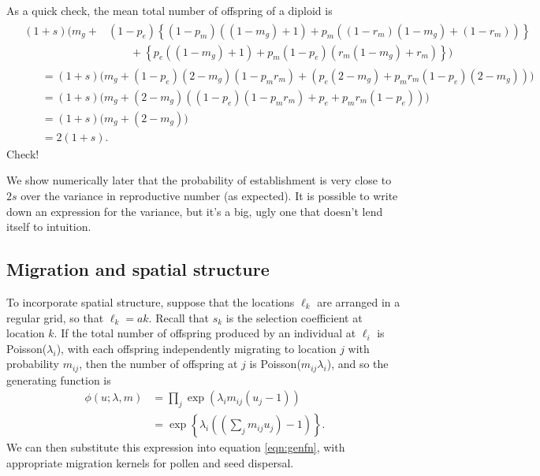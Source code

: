 As a quick check,
the mean total number of offspring of a diploid is
\begin{align}
  & \begin{aligned}
(1+s) \big(
    m_g
    + & (1-p_e)\left\{ (1-p_m) ( (1-m_g) + 1 ) + p_m ( (1-r_m)(1-m_g) + (1-r_m) ) \right\} \\
    & \qquad + \left\{ p_e ( (1-m_g) + 1 ) + p_m (1-p_e)( r_m(1-m_g) + r_m ) \right\} 
    \big) 
  \end{aligned}  \\
& \qquad = 
    (1+s) \big( m_g + 
      (1-p_e)(2-m_g)(1 - p_m r_m)
      + ( p_e (2-m_g) + p_m r_m (1-p_e)(2-m_g) )
    \big) \\
& \qquad = (1+s) \big( 
    m_g + (2-m_g) ( (1-p_e) (1 - p_m r_m) + p_e + p_m r_m(1-p_e) )
  \big) \\
& \qquad = (1+s) \big( 
    m_g + (2-m_g)
  \big) \\
& \qquad = 2(1+s) .
\end{align}
Check!

We show numerically later that the probability of establishment is very close to $2s$ over the variance in reproductive number (as expected).
It is possible to write down an expression for the variance, but it's a big, ugly one that doesn't lend itself to intuition.

\subsection{Migration and spatial structure}

To incorporate spatial structure, suppose that the locations $\ell_k$ are arranged in a regular grid, so that $\ell_k = a k$. 
Recall that $s_k$ is the selection coefficient at location $k$.
If the total number of offspring produced by an individual at $\ell_i$ is Poisson($\lambda_i$), with each offspring independently migrating to location $j$
with probability $m_{ij}$,
then the number of offspring at $j$ is Poisson($m_{ij}\lambda_i$),
and so the generating function is
\begin{align}
  \phi(u;\lambda,m) &= \prod_j \exp( \lambda_i m_{ij} ( u_j - 1 ) ) \\
  &= \exp\left\{ \lambda_i \left(\left(\sum_j m_{ij} u_j\right) - 1\right) \right\} .
\end{align}
We can then substitute this expression into equation \eqref{eqn:genfn},
with appropriate migration kernels for pollen and seed dispersal.

